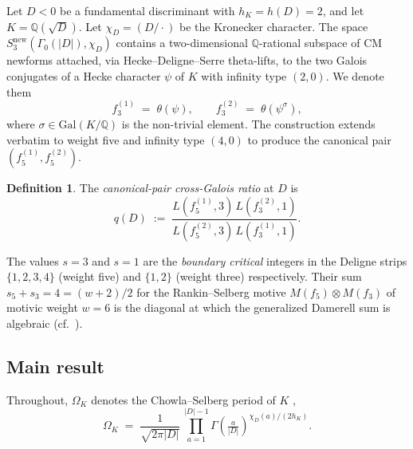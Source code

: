 \documentclass[11pt,a4paper]{amsart}
\theoremstyle{plain}
\theoremstyle{definition}
\newtheorem{definition}[theorem]{Definition}
\newcommand{\Q}{\mathbb{Q}}
\newcommand{\Gal}{\mathrm{Gal}}
\begin{document}
Let $D<0$ be a fundamental discriminant with $h_K=h(D)=2$, and let
$K=\Q(\sqrt{D})$. Let $\chi_D=(D/\cdot)$ be the Kronecker character.
The space $S_3^{\mathrm{new}}(\Gamma_0(|D|),\chi_D)$ contains a
two-dimensional $\Q$-rational subspace of CM newforms attached, via
Hecke--Deligne--Serre theta-lifts, to the two Galois conjugates of a
Hecke character $\psi$ of $K$ with infinity type $(2,0)$. We denote them
\[
  f_3^{(1)} \;=\; \theta(\psi),\qquad
  f_3^{(2)} \;=\; \theta(\psi^{\sigma}),
\]
where $\sigma\in\Gal(K/\Q)$ is the non-trivial element.
The construction extends verbatim to weight five and infinity type $(4,0)$
to produce the canonical pair $(f_5^{(1)},f_5^{(2)})$.

\begin{definition}
\label{def:qD}
The \emph{canonical-pair cross-Galois ratio} at $D$ is
\begin{equation}
\label{eq:qD-def}
  q(D) \;:=\;
  \frac{L(f_5^{(1)},3)\,L(f_3^{(2)},1)}{L(f_5^{(2)},3)\,L(f_3^{(1)},1)}.
\end{equation}
\end{definition}

The values $s=3$ and $s=1$ are the \emph{boundary critical} integers in the
Deligne strips $\{1,2,3,4\}$ (weight five) and $\{1,2\}$ (weight three)
respectively. Their sum $s_5+s_3=4=(w+2)/2$ for the Rankin--Selberg motive
$M(f_5)\otimes M(f_3)$ of motivic weight $w=6$ is the diagonal at which the
generalized Damerell sum is algebraic
(cf.~\cite{Damerell1971a,Damerell1971b,Shimura1971,Shimura1976}).

\subsection{Main result}

Throughout, $\Omega_K$ denotes the Chowla--Selberg period of $K$
\cite{ChowlaSelberg1949},
\begin{equation}
\label{eq:CS}
  \Omega_K \;=\; \frac{1}{\sqrt{2\pi|D|}}\,
  \prod_{a=1}^{|D|-1}\Gamma\!\left(\tfrac{a}{|D|}\right)^{\!\chi_D(a)/(2h_K)}.
\end{equation}
\end{document}
